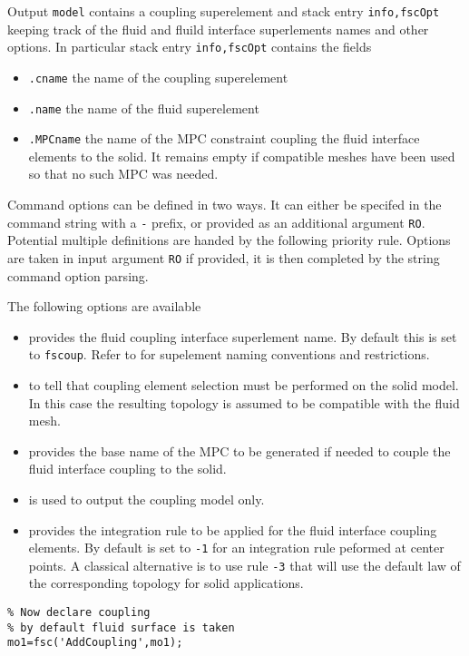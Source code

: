 \begin{SDT}
Output {\tt model} contains a coupling superelement and stack entry {\tt info,fscOpt} keeping track of the fluid and fluild interface superlements names and other options. In particular stack entry {\tt info,fscOpt} contains the fields
\begin{itemize}
\item {\tt .cname} the name of the coupling superelement
\item {\tt .name} the name of the fluid superelement
\item {\tt .MPCname} the name of the MPC constraint coupling the fluid interface elements to the solid. It remains empty if compatible meshes have been used so that no such MPC was needed.
\end{itemize}

Command options can be defined in two ways. It can either be specifed in the  command string with a {\tt -} prefix, or provided as an additional argument {\tt RO}. Potential multiple definitions are handed by the following priority rule. Options are taken in input argument {\tt RO} if provided, it is then completed by the string command option parsing. 


The following options are available
\begin{itemize}
\item {} provides the fluid coupling interface superlement name. By default this is set to {\tt fscoup}. Refer to  for supelement naming conventions and restrictions.
\item {} to tell that coupling element selection must be performed on the solid model. In this case the resulting topology is assumed to be compatible with the fluid mesh.
\item {} provides the base name of the  MPC to be generated if needed to couple the fluid interface coupling to the solid.
\item {} is used to output the coupling model only.
\item {} provides the integration rule to be applied for the fluid interface coupling elements. By default  is set to {\tt -1} for an integration rule peformed at center points. A classical alternative is to use rule {\tt -3} that will use the default law of the corresponding topology for solid applications.
\end{itemize}

\begin{verbatim}
% Now declare coupling
% by default fluid surface is taken
mo1=fsc('AddCoupling',mo1);
\end{verbatim}%



\end{SDT}
